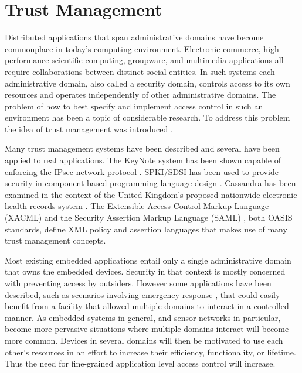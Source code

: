 
\chapter{Trust Management}
\label{chapter-trust-management}

Distributed applications that span administrative domains have become commonplace in today's
computing environment. Electronic commerce, high performance scientific computing, groupware,
and multimedia applications all require collaborations between distinct social entities. In such
systems each administrative domain, also called a security domain, controls access to its own
resources and operates independently of other administrative domains. The problem of how to best
specify and implement access control in such an environment has been a topic of considerable
research. To address this problem the idea of trust management was introduced \cite{Blaze:DTM}.

Many trust management systems have been described and several have been applied to real
applications. The KeyNote system has been shown capable of enforcing the IPsec network protocol
\cite{Blaze:TMIPS,Blaze:EKTMS}. SPKI/SDSI has been used to provide security in component based
programming language design \cite{Liu:CSI}. Cassandra has been examined in the context of the
United Kingdom's proposed nationwide electronic health records system \cite{Becker:CFTMAEHR}.
The Extensible Access Control Markup Language (XACML) \cite{OASIS:XACMLTC} and the Security
Assertion Markup Language (SAML) \cite{OASIS:SSTC}, both OASIS standards, define XML policy and
assertion languages that makes use of many trust management concepts.

Most existing embedded applications entail only a single administrative domain that owns the
embedded devices. Security in that context is mostly concerned with preventing access by
outsiders. However some applications have been described, such as scenarios involving emergency
response \cite{1038146}, that could easily benefit from a facility that allowed multiple domains
to interact in a controlled manner. As embedded systems in general, and sensor networks in
particular, become more pervasive situations where multiple domains interact will become more
common. Devices in several domains will then be motivated to use each other's resources in an
effort to increase their efficiency, functionality, or lifetime. Thus the need for fine-grained
application level access control will increase.

